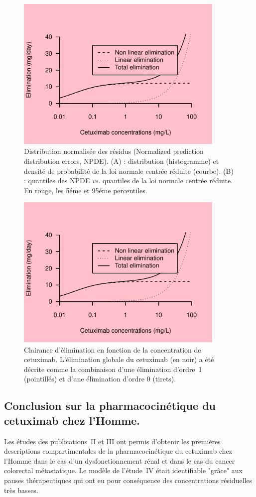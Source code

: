 \begin{figure}[htbp]
	\centering
		\includegraphics[width=10cm]{images/essai001.pdf}
	\caption{Distribution normalisée des résidus (Normalized prediction distribution errors, NPDE). (A) : distribution (histogramme) et densité de probabilité de la loi normale centrée réduite (courbe). (B) : quantiles des NPDE \textit{vs.} quantiles de la loi normale centrée réduite. En rouge, les 5éme et 95éme percentiles.}
	\label{fig:21}
\end{figure}
\begin{figure}[htbp]
	\centering
		\includegraphics[width=10cm]{images/essai001.pdf}
	\caption{Clairance d'élimination en fonction de la concentration de cetuximab. L'élimination globale du cetuximab (en noir) a été décrite comme la combinaison d'une élimination d'ordre~1 (pointillés) et d'une élimination d'ordre 0 (tirets).}
	\label{fig:22}
\end{figure}

\subsection{Conclusion sur la pharmacocinétique du cetuximab chez l'Homme.}
Les études des publications~II et III ont permis d'obtenir les premières descriptions compartimentales de la pharmacocinétique du cetuximab chez l'Homme dans le cas d'un dysfonctionnement rénal et dans le cas du cancer colorectal métastatique. Le modèle de l'étude~IV était identifiable "grâce" aux pauses thérapeutiques qui ont eu pour conséquence des concentrations résiduelles très basses.

